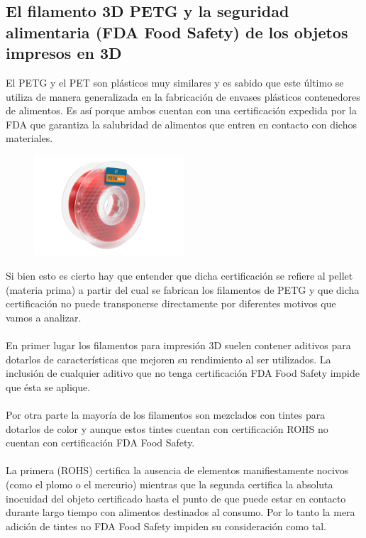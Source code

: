 \documentclass[11pt,a4paper]{article}
\begin{document}
	\subsection{El filamento 3D PETG y la seguridad alimentaria (FDA Food Safety) de los objetos impresos en 3D}El PETG y el PET son plásticos muy similares y es sabido que este último se utiliza de manera generalizada en la fabricación de envases plásticos contenedores de alimentos. Es así porque ambos cuentan con una certificación expedida por la FDA que garantiza la salubridad de alimentos que entren en contacto con dichos materiales.
\begin{figure}[H]
\centering
\includegraphics[width=0.5\textwidth,cfbox=azul_marcos 1pt 0pt]{FOTOS/PETGKILOROJO}
\end{figure}
Si bien esto es cierto hay que entender que dicha certificación se refiere al pellet (materia prima) a partir del cual se fabrican los filamentos de PETG y que dicha certificación no puede transponerse directamente por diferentes motivos que vamos a analizar.
\\\\
En primer lugar los filamentos para impresión 3D suelen contener aditivos para dotarlos de características que mejoren su rendimiento al ser utilizados. La inclusión de cualquier aditivo que no tenga certificación FDA Food Safety impide que ésta se aplique.
\\\\
Por otra parte la mayoría de los filamentos son mezclados con tintes para dotarlos de color y aunque estos tintes cuentan con certificación ROHS no cuentan con certificación FDA Food Safety.
\\\\
La primera (ROHS) certifica la ausencia de elementos manifiestamente nocivos (como el plomo o el mercurio) mientras que la segunda certifica la absoluta inocuidad del objeto certificado hasta el punto de que puede estar en contacto durante largo tiempo con alimentos destinados al consumo. Por lo tanto la mera adición de tintes no FDA Food Safety impiden su consideración como tal.
\end{document}
